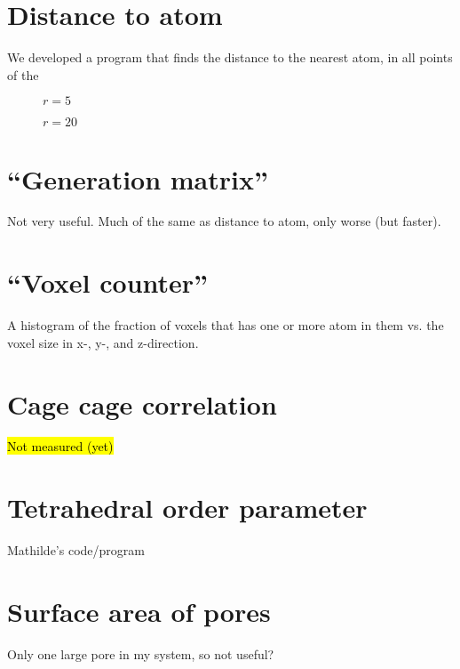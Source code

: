 \section{Distance to atom}
We developed a program that finds the distance to the nearest atom, in all points of the 
%
\begin{figure}[htpb]%
    \centering%
    \caption{$r = 5$ \Ang}%
    \label{fig:distance_to_atom_r05}%
\end{figure}%
%
\begin{figure}[htpb]%
    \centering%
    \caption{$r = 20$ \Ang}%
    \label{fig:distance_to_atom_r20}%
\end{figure}%

\section{``Generation matrix''}
    Not very useful. Much of the same as distance to atom, only worse (but faster).
\section{``Voxel counter''}
    A histogram of the fraction of voxels that has one or more atom in them vs. the voxel size in x-, y-, and z-direction.
\section{Cage cage correlation}
    \hl{Not measured (yet)}
\section{Tetrahedral order parameter}
    Mathilde's code/program
\section{Surface area of pores}
    Only one large pore in my system, so not useful?
